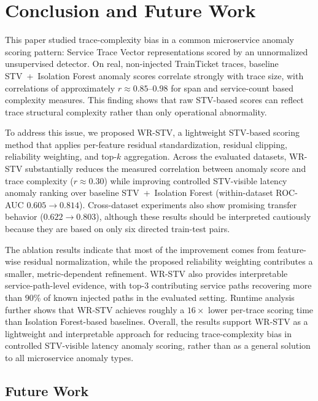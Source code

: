 \section{Conclusion and Future Work}
\label{sec:conclusion}

This paper studied trace-complexity bias in a common microservice
anomaly scoring pattern: Service Trace Vector representations scored by
an unnormalized unsupervised detector. On real, non-injected TrainTicket
traces, baseline STV~+~Isolation Forest anomaly scores correlate strongly
with trace size, with correlations of approximately
\(r \approx 0.85\)--\(0.98\) for span and service-count based complexity
measures. This finding shows that raw STV-based scores can reflect trace
structural complexity rather than only operational abnormality.

To address this issue, we proposed WR-STV, a lightweight STV-based
scoring method that applies per-feature residual standardization,
residual clipping, reliability weighting, and top-\(k\) aggregation.
Across the evaluated datasets, WR-STV substantially reduces the measured
correlation between anomaly score and trace complexity
(\(r \approx 0.30\)) while improving controlled STV-visible latency
anomaly ranking over baseline STV~+~Isolation Forest
(within-dataset ROC-AUC \(0.605 \rightarrow 0.814\)). Cross-dataset
experiments also show promising transfer behavior
(\(0.622 \rightarrow 0.803\)), although these results should be
interpreted cautiously because they are based on only six directed
train-test pairs.

The ablation results indicate that most of the improvement comes from
feature-wise residual normalization, while the proposed reliability
weighting contributes a smaller, metric-dependent refinement. WR-STV
also provides interpretable service-path-level evidence, with top-3
contributing service paths recovering more than \(90\%\) of known
injected paths in the evaluated setting. Runtime analysis further shows
that WR-STV achieves roughly a \(16\times\) lower per-trace scoring time
than Isolation Forest-based baselines. Overall, the results support
WR-STV as a lightweight and interpretable approach for reducing
trace-complexity bias in controlled STV-visible latency anomaly scoring,
rather than as a general solution to all microservice anomaly types.

\subsection*{Future Work}

